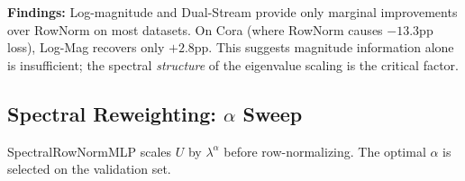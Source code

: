 \documentclass[11pt]{article}
\begin{document}
\noindent\textbf{Findings:}
Log-magnitude and Dual-Stream provide only marginal improvements over RowNorm on most
datasets.  On Cora (where RowNorm causes $-13.3$pp loss), Log-Mag recovers only $+2.8$pp.
This suggests magnitude information alone is insufficient; the spectral \emph{structure}
of the eigenvalue scaling is the critical factor.

\subsection{Spectral Reweighting: $\alpha$ Sweep}

SpectralRowNormMLP scales $U$ by $\lambda^\alpha$ before row-normalizing.  The optimal
$\alpha$ is selected on the validation set.

\end{document}
